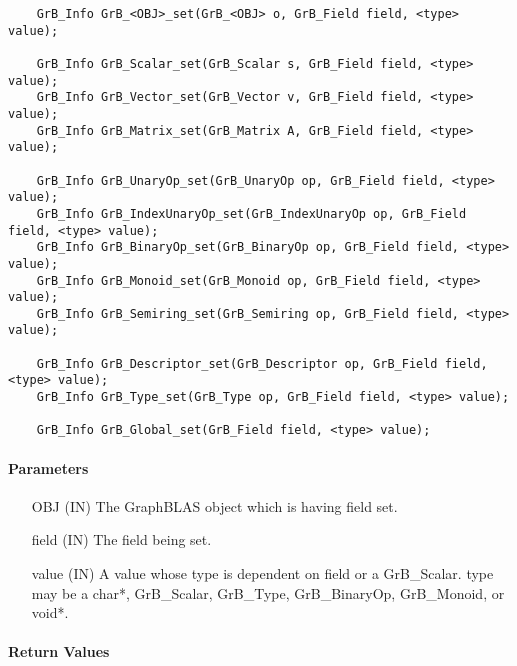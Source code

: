 \begin{verbatim}
    GrB_Info GrB_<OBJ>_set(GrB_<OBJ> o, GrB_Field field, <type> value);

    GrB_Info GrB_Scalar_set(GrB_Scalar s, GrB_Field field, <type> value);
    GrB_Info GrB_Vector_set(GrB_Vector v, GrB_Field field, <type> value);
    GrB_Info GrB_Matrix_set(GrB_Matrix A, GrB_Field field, <type> value);

    GrB_Info GrB_UnaryOp_set(GrB_UnaryOp op, GrB_Field field, <type> value);
    GrB_Info GrB_IndexUnaryOp_set(GrB_IndexUnaryOp op, GrB_Field field, <type> value);
    GrB_Info GrB_BinaryOp_set(GrB_BinaryOp op, GrB_Field field, <type> value);
    GrB_Info GrB_Monoid_set(GrB_Monoid op, GrB_Field field, <type> value);
    GrB_Info GrB_Semiring_set(GrB_Semiring op, GrB_Field field, <type> value);

    GrB_Info GrB_Descriptor_set(GrB_Descriptor op, GrB_Field field, <type> value);
    GrB_Info GrB_Type_set(GrB_Type op, GrB_Field field, <type> value);

    GrB_Info GrB_Global_set(GrB_Field field, <type> value);
\end{verbatim}

\paragraph{Parameters}

\begin{itemize}[leftmargin=2.1in]
    \item[{\sf OBJ}] ({\sf IN}) The GraphBLAS object which is having {\sf field} set.
    \item[{\sf field}] ({\sf IN}) The field being set.
    \item[{\sf value}] ({\sf IN}) A value whose type is dependent on {\sf field} or a {\sf GrB\_Scalar}.
                                {\sf type} may be a {\sf char*}, {\sf GrB\_Scalar}, {\sf GrB\_Type}, 
                                {\sf GrB\_BinaryOp}, {\sf GrB\_Monoid}, or {\sf void*}.
\end{itemize}

\paragraph{Return Values}

